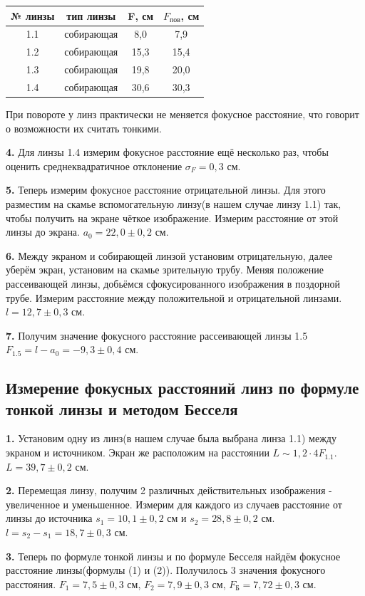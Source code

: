\documentclass[a4paper,12pt]{article}
\begin{document}
\begin{table}[H]
\centering
	\begin{tabular}{|c|c|c|c|} 
	\hline
	№ линзы & тип линзы & F, см & $F_\text{пов}$, см \\ \hline
	1.1 & собирающая & 8,0 & 7,9 \\ \hline
	1.2 & собирающая & 15,3 & 15,4 \\ \hline
	1.3 & собирающая & 19,8 & 20,0 \\ \hline
	1.4 & собирающая & 30,6 & 30,3 \\ \hline
	\end{tabular}
\end{table}
При повороте у линз практически не меняется фокусное расстояние, что говорит о возможности их считать тонкими.

\textbf{4.} Для линзы 1.4 измерим фокусное расстояние ещё несколько раз, чтобы оценить среднеквадратичное отклонение $\sigma_F = 0,3$ см.

\textbf{5.} Теперь измерим фокусное расстояние отрицательной линзы. Для этого разместим на скамье вспомогательную линзу(в нашем случае линзу 1.1) так, чтобы получить на экране чёткое изображение. Измерим расстояние от этой линзы до экрана. $a_0 = 22,0 \pm 0,2$ см.

\textbf{6.} Между экраном и собирающей линзой установим отрицательную, далее уберём экран, установим на скамье зрительную трубу. Меняя положение рассеивающей линзы, добьёмся сфокусированного изображения в поздорной трубе. Измерим расстояние между положительной и отрицательной линзами. $l = 12,7 \pm 0,3$ см.

\textbf{7.} Получим значение фокусного расстояние рассеивающей линзы 1.5 $F_{1.5} = l - a_0 = -9,3 \pm 0,4$ см.

\subsection*{Измерение фокусных расстояний линз по формуле тонкой линзы и методом Бесселя}
\textbf{1.} Установим одну из линз(в нашем случае была выбрана линза 1.1) между экраном и источником. Экран же расположим на расстоянии $L \sim 1,2 \cdot 4F_{1.1}$. $L = 39,7 \pm 0,2$ см.

\textbf{2.} Перемещая линзу, получим 2 различных действительных изображения - увеличенное и уменьшенное. Измерим для каждого из случаев расстояние от линзы до источника $s_1 = 10,1 \pm 0,2$ см и $s_2 = 28,8 \pm 0,2$ см. $l = s_2 - s_1 = 18,7 \pm 0,3$ см.

\textbf{3.} Теперь по формуле тонкой линзы и по формуле Бесселя найдём фокусное расстояние линзы(формулы (1) и (2)). Получилось 3 значения фокусного расстояния.
$F_1 = 7,5 \pm 0,3$ см, $F_2 = 7,9 \pm 0,3$ см, $F_\text{Б} = 7,72 \pm 0,3$ см.
\end{document}
